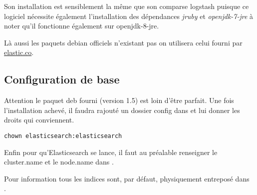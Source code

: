 Son installation est sensiblement la même que son comparse logstash puisque ce logiciel 
nécessite également l'installation des dépendances \emph{jruby} et \emph{openjdk-7-jre}
à noter qu'il fonctionne également sur openjdk-8-jre.

Là aussi les paquets debian officiels n'existant pas on utilisera celui fourni par 
\hyperref[https://download.elastic.co/elasticsearch/elasticsearch/elasticsearch-1.5.1.deb]{elastic.co}.

\subsection{Configuration de base}
Attention le paquet deb fourni (version 1.5) est loin d'être parfait.
Une fois l'installation achevé, il faudra rajouté un dossier config
dans  et lui donner les droits qui conviennent.
\begin{lstlisting}[style=code,label={lst:ajoutdepotconfigchown}]
chown elasticsearch:elasticsearch
\end{lstlisting}

Enfin pour qu'Elasticsearch se lance, il faut au préalable renseigner le cluster.name
et le node.name dans .

Pour information tous les indices sont, par défaut, physiquement entreposé dans\\
.






